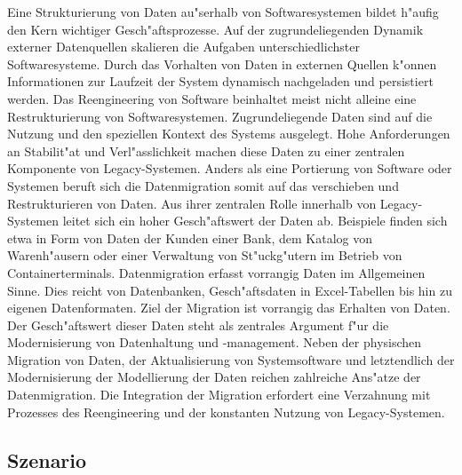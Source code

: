 Eine Strukturierung von Daten au"serhalb von Softwaresystemen bildet h"aufig den Kern wichtiger Gesch"aftsprozesse. Auf der zugrundeliegenden Dynamik externer Datenquellen skalieren die Aufgaben unterschiedlichster Softwaresysteme. Durch das Vorhalten von Daten in externen Quellen k"onnen Informationen zur Laufzeit der System dynamisch nachgeladen und persistiert werden.
\lb
Das Reengineering von Software beinhaltet meist nicht alleine eine Restrukturierung von Softwaresystemen. Zugrundeliegende Daten sind auf die Nutzung und den speziellen Kontext des Systems ausgelegt. Hohe Anforderungen an Stabilit"at und Verl"asslichkeit machen diese Daten zu einer zentralen Komponente von Legacy-Systemen.
\lb
Anders als eine Portierung von Software oder Systemen beruft sich die Datenmigration somit auf das verschieben und Restrukturieren von Daten.
\lb
Aus ihrer zentralen Rolle innerhalb von Legacy-Systemen leitet sich ein hoher Gesch"aftswert der Daten ab. Beispiele finden sich etwa in Form von Daten der Kunden einer Bank, dem Katalog von Warenh"ausern oder einer Verwaltung von St"uckg"utern im Betrieb von Containerterminals. 
\lb
Datenmigration erfasst vorrangig Daten im Allgemeinen Sinne. Dies reicht von Datenbanken, Gesch"aftsdaten in Excel-Tabellen bis hin zu eigenen Datenformaten. Ziel der Migration ist vorrangig das Erhalten von Daten. Der Gesch"aftswert dieser Daten steht als zentrales Argument f"ur die Modernisierung von Datenhaltung und -management. Neben der physischen Migration von Daten, der Aktualisierung von Systemsoftware und letztendlich der Modernisierung der Modellierung der Daten reichen zahlreiche Ans"atze der Datenmigration. Die Integration der Migration erfordert eine Verzahnung mit Prozesses des Reengineering und der konstanten Nutzung von Legacy-Systemen.

\subsection{Szenario}

